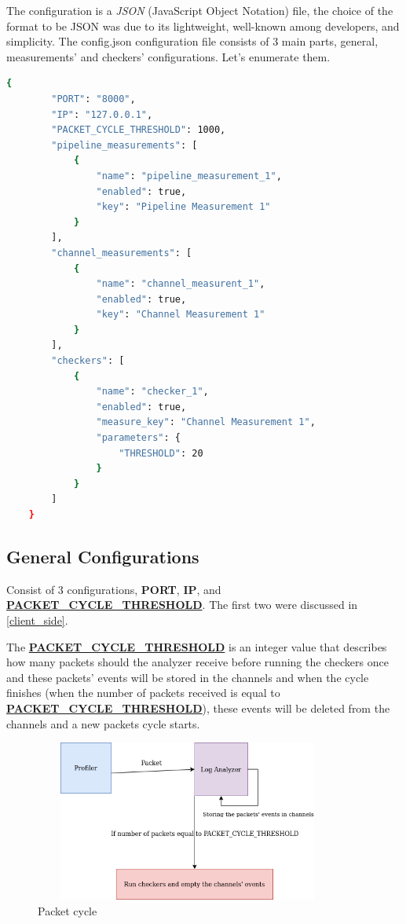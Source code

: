 The configuration is a \textit{JSON} (JavaScript Object Notation) file,
the choice of the format to be JSON was due to its
lightweight, well-known among developers, and simplicity. 
The config.json configuration file consists of 3 main parts, 
general, measurements' and checkers' configurations. Let's enumerate them.
\newline
\begin{lstlisting}[language=bash, caption={Sample configuration},captionpos=b, label={lst:sample_confing}]
	{
		"PORT": "8000",
		"IP": "127.0.0.1",
		"PACKET_CYCLE_THRESHOLD": 1000,
		"pipeline_measurements": [
			{
				"name": "pipeline_measurement_1",
				"enabled": true,
				"key": "Pipeline Measurement 1"
			}
		],
		"channel_measurements": [
			{
				"name": "channel_measurent_1",
				"enabled": true,
				"key": "Channel Measurement 1"
			}
		],
		"checkers": [
			{
				"name": "checker_1",
				"enabled": true,
				"measure_key": "Channel Measurement 1",
				"parameters": {
					"THRESHOLD": 20
				}
			}
		]
	}
\end{lstlisting}

\subsection{General Configurations} \label{sec:g_config}
Consist of 3 configurations, \textbf{PORT}, \textbf{IP}, 
and \textbf{\url{PACKET_CYCLE_THRESHOLD}}. The first two were discussed in \ref{client_side}.

The \textbf{\url{PACKET_CYCLE_THRESHOLD}} is an integer value that describes
how many packets should the analyzer receive before running the checkers once
and these packets' events will be stored in the channels and when the cycle
finishes (when the number of packets received is equal to \textbf{\url{PACKET_CYCLE_THRESHOLD}}), these
events will be deleted from the channels and a new packets cycle starts.
\newline
\begin{figure}[H]
	\centering
	\includegraphics[width=0.9\textwidth,height=200px]{images/packets_cycle.png}
	\caption{Packet cycle}
	\label{fig:packets_cycle}
\end{figure}


